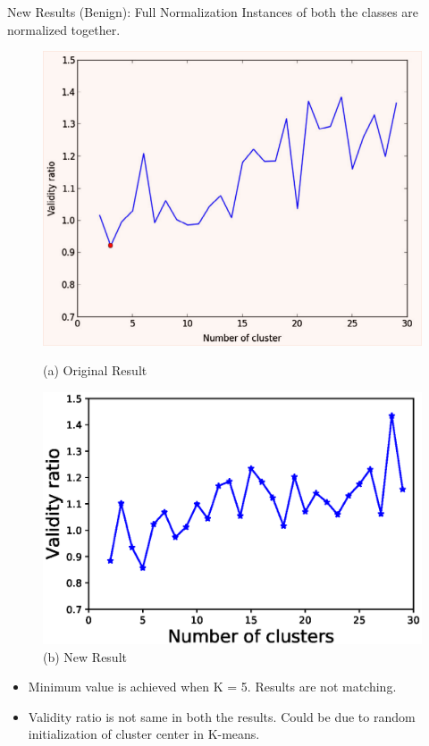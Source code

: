 \documentclass[xcolor=dvipsnames]{beamer}
\begin{document}
\begin{frame}{New Results (Benign): Full Normalization}
Instances of both the classes are normalized together.
\begin{figure}[H]
\begin{minipage}[t]{0.5\linewidth}
    \includegraphics[scale=0.2]{Figures/BenignOriginal}
    \caption*{(a) Original Result}
\end{minipage}%
\begin{minipage}[t]{0.5\linewidth}
    \includegraphics[scale=0.43]{Figures/Benign_VR_K_AllX.eps}
    \caption*{(b) New Result}
\end{minipage} 
\end{figure} 

\begin{block}{}
\begin{itemize}
\item Minimum value is achieved when K = 5. Results are not matching.
\item Validity ratio is not same in both the results. Could be due to random initialization of cluster center in K-means.
\end{itemize} 
\end{block}
\end{frame}
\end{document}
